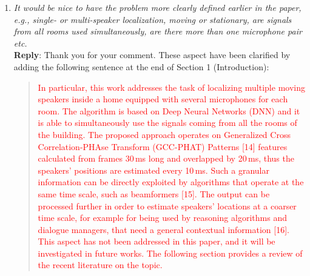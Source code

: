 \documentclass[11pt, technote, letterpaper, oneside, onecolumn]{IEEEtran}
\begin{document}
\begin{enumerate}
\item \textit{It would be nice to have the problem more clearly defined earlier in the paper, e.g., single- or multi-speaker localization, moving or stationary, are signals from all rooms used simultaneously, are there more than one microphone pair etc.\\}
\textbf{Reply}: Thank you for your comment. These aspect have been clarified by adding the following sentence at the end of Section 1 (Introduction):

\begin{quote}
\textcolor{red}{
In particular, this work addresses the task of localizing multiple moving speakers inside a home equipped with several microphones for each room. The algorithm is based on Deep Neural Networks (DNN) and it is able to simultaneously use the signals coming from all the rooms of the building. The proposed approach operates on Generalized Cross Correlation-PHAse Transform (GCC-PHAT) Patterns [14] features calculated from frames 30\,ms long and overlapped by 20\,ms, thus the speakers' positions are estimated every 10\,ms. Such a granular information can be directly exploited by algorithms that operate at the same time scale, such as beamformers [15]. The output can be processed further in order to estimate speakers' locations at a coarser time scale, for example for being used by reasoning algorithms and dialogue managers, that need a general contextual information [16]. This aspect has not been addressed in this paper, and it will be investigated in future works. The following section provides a review of the recent literature on the topic.
}
\end{quote}


\end{enumerate}
\end{document}
